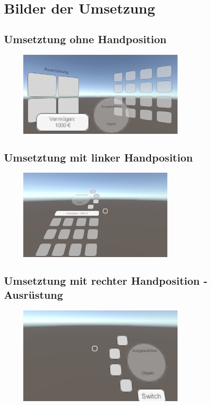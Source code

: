
\chapter{Bilder der Umsetzung}\label{chapter:appendix}

	\section{Umsetztung ohne Handposition}\label{chapter:bildO}
	\begin{figure}[htbp]
		\centering
		\includegraphics[width=0.75\textwidth]{Fragen/UmsetzungO1.png}
	\end{figure}
	
	\section{Umsetztung mit linker Handposition}\label{chapter:bildL}
	\begin{figure}[htbp]
		\centering
		\includegraphics[width=0.7\textwidth]{Fragen/UmsetzungL1.png}
	\end{figure}
	
	\section{Umsetztung mit rechter Handposition - Ausrüstung}\label{chapter:bildRA}
	\begin{figure}[htbp]
		\centering
		\includegraphics[width=0.75\textwidth]{Fragen/UmsetzungR1.png}
	\end{figure}
	
